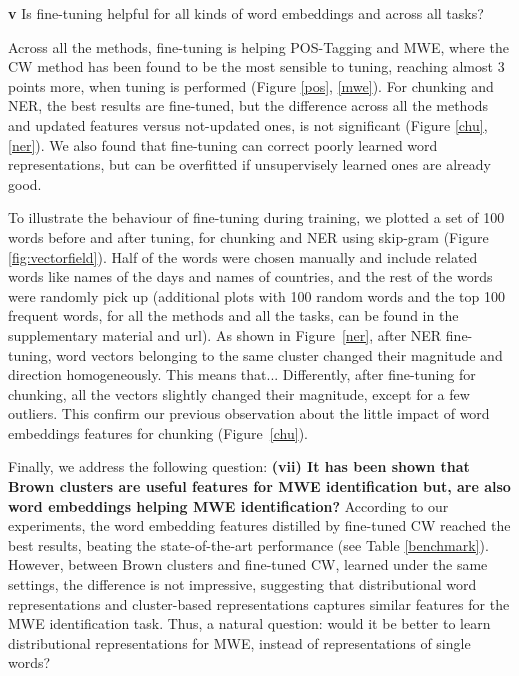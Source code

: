 
\textbf{v} Is fine-tuning helpful for all kinds of word embeddings and across all tasks?

Across all the methods, fine-tuning is helping POS-Tagging and MWE, where the CW method has been found to be the most sensible to tuning, reaching almost 3 points more, when tuning is performed (Figure \ref{pos}, \ref{mwe}). 
For chunking and NER, the best results are fine-tuned, but the difference across all the methods and updated features versus not-updated ones, is not significant (Figure \ref{chu}, \ref{ner}). 
We also found that fine-tuning can correct poorly learned word representations, but can be
overfitted if unsupervisely learned ones are already good. 

To illustrate the behaviour of fine-tuning during training, we plotted a set of 100 words before and after tuning, for chunking and NER using skip-gram (Figure \ref{fig:vectorfield}). 
Half of the words were chosen manually and include related words like names of the days and names of countries, and the rest of the words were randomly pick up (additional plots with 100 random words and the top 100 frequent words, for all the methods and all the tasks, can be found in the supplementary material and {\color{red} url}).
As shown in Figure~\ref{ner}, after NER fine-tuning, word vectors belonging to the same cluster changed their magnitude and direction homogeneously. {\color{red} This means that...}
Differently, after fine-tuning for chunking, all the vectors slightly changed their magnitude, except for a few outliers. This confirm our previous observation about the little impact of word embeddings features for chunking (Figure~\ref{chu}). 

Finally, we address the following question: \textbf{(vii) It has been shown that Brown clusters are useful features for MWE identification but, are also word embeddings helping MWE identification?} 
According to our experiments, the word embedding features distilled by fine-tuned CW reached the best results, beating the state-of-the-art performance (see Table \ref{benchmark}).
However, between Brown clusters and fine-tuned CW, learned under the same settings, the difference is not impressive, suggesting that distributional word representations and cluster-based representations captures similar features for the MWE identification task.
Thus, a natural question: would it be better to learn distributional representations for MWE, instead of representations of single words?



